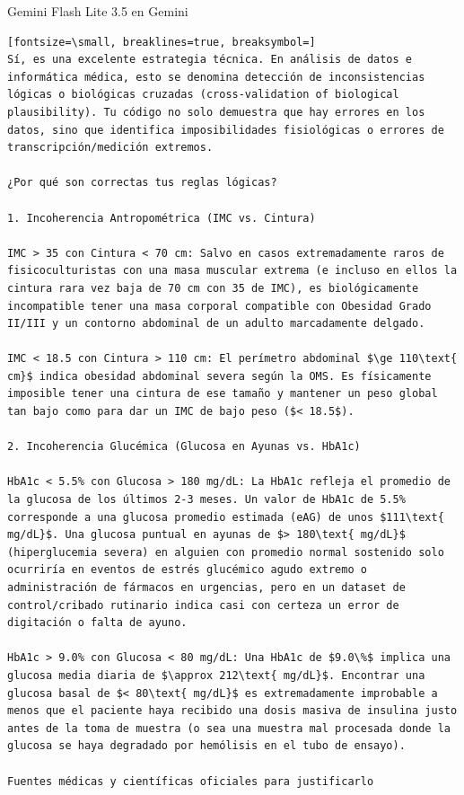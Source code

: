 \documentclass[12pt,a4paper,oneside]{book}
\begin{document}
\begin{iaresp}{Gemini Flash Lite 3.5 en Gemini}
\begin{Verbatim}[fontsize=\small, breaklines=true, breaksymbol=]
Sí, es una excelente estrategia técnica. En análisis de datos e informática médica, esto se denomina detección de inconsistencias lógicas o biológicas cruzadas (cross-validation of biological plausibility). Tu código no solo demuestra que hay errores en los datos, sino que identifica imposibilidades fisiológicas o errores de transcripción/medición extremos.

¿Por qué son correctas tus reglas lógicas?

1. Incoherencia Antropométrica (IMC vs. Cintura)

IMC > 35 con Cintura < 70 cm: Salvo en casos extremadamente raros de fisicoculturistas con una masa muscular extrema (e incluso en ellos la cintura rara vez baja de 70 cm con 35 de IMC), es biológicamente incompatible tener una masa corporal compatible con Obesidad Grado II/III y un contorno abdominal de un adulto marcadamente delgado.

IMC < 18.5 con Cintura > 110 cm: El perímetro abdominal $\ge 110\text{ cm}$ indica obesidad abdominal severa según la OMS. Es físicamente imposible tener una cintura de ese tamaño y mantener un peso global tan bajo como para dar un IMC de bajo peso ($< 18.5$).

2. Incoherencia Glucémica (Glucosa en Ayunas vs. HbA1c)

HbA1c < 5.5% con Glucosa > 180 mg/dL: La HbA1c refleja el promedio de la glucosa de los últimos 2-3 meses. Un valor de HbA1c de 5.5% corresponde a una glucosa promedio estimada (eAG) de unos $111\text{ mg/dL}$. Una glucosa puntual en ayunas de $> 180\text{ mg/dL}$ (hiperglucemia severa) en alguien con promedio normal sostenido solo ocurriría en eventos de estrés glucémico agudo extremo o administración de fármacos en urgencias, pero en un dataset de control/cribado rutinario indica casi con certeza un error de digitación o falta de ayuno.

HbA1c > 9.0% con Glucosa < 80 mg/dL: Una HbA1c de $9.0\%$ implica una glucosa media diaria de $\approx 212\text{ mg/dL}$. Encontrar una glucosa basal de $< 80\text{ mg/dL}$ es extremadamente improbable a menos que el paciente haya recibido una dosis masiva de insulina justo antes de la toma de muestra (o sea una muestra mal procesada donde la glucosa se haya degradado por hemólisis en el tubo de ensayo).

Fuentes médicas y científicas oficiales para justificarlo


\end{Verbatim}
\end{iaresp}
\end{document}
